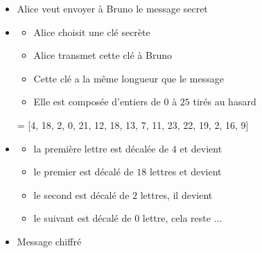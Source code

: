 \begin{frame}
\begin{itemize}\setlength{\itemsep}{6pt}
  \item Alice veut envoyer à Bruno le message secret  
\centerline{}
\pause

  \item 
  \begin{itemize}\setlength{\itemsep}{4pt}
    \item Alice choisit une clé secrète 
\pause    
    \item Alice transmet cette clé à Bruno
\pause    
    \item Cette clé a la même longueur que le message
\pause
    \item Elle est composée d'entiers de $0$ à $25$ tirés au hasard
  \end{itemize}
\pause
\smallskip

\centerline{ = [4, 18, 2, 0, 21, 12, 18, 13, 7, 11, 23, 22, 19, 2, 16, 9]}  

\pause
  \item
  \begin{itemize}\setlength{\itemsep}{4pt}
    \item la première lettre  est décalée de $4$ et devient 
\pause    
    \item le premier  est décalé de $18$ lettres et devient 
 \pause   
    \item le second  est décalé de $2$ lettres, il devient 
 \pause   
    \item le  suivant est décalé de $0$ lettre, cela reste ...
  \end{itemize}

\pause  
  \item Message chiffré   \\
\centerline{}
\end{itemize}


\end{frame}



